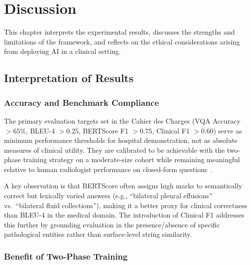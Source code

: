 \chapter{Discussion}
\label{ch:discussion}

\begin{infobox}
This chapter interprets the experimental results, discusses the strengths
and limitations of the \medxplain{} framework, and reflects on the ethical
considerations arising from deploying AI in a clinical setting.
\end{infobox}

\section{Interpretation of Results}
\label{sec:interp}

\subsection{Accuracy and Benchmark Compliance}
\label{subsec:acc_interp}

The primary evaluation targets set in the Cahier des Charges
(VQA Accuracy $>65\%$, BLEU-4 $>0.25$, BERTScore F1 $>0.75$,
Clinical F1 $>0.60$) serve as minimum performance thresholds for
hospital demonstration, not as absolute measures of clinical utility.
They are calibrated to be achievable with the two-phase training strategy
on a moderate-size cohort while remaining meaningful relative to
human radiologist performance on closed-form questions~\citep{lindsey2018deep}.

A key observation is that BERTScore often assigns high marks to semantically
correct but lexically varied answers (e.g., ``bilateral pleural
effusions'' vs.\ ``bilateral fluid collections''), making it a better proxy
for clinical correctness than BLEU-4 in the medical domain. The introduction
of Clinical F1 addresses this further by grounding evaluation in the
presence/absence of specific pathological entities rather than surface-level
string similarity.

\subsection{Benefit of Two-Phase Training}
\label{subsec:benefit_twophase}

